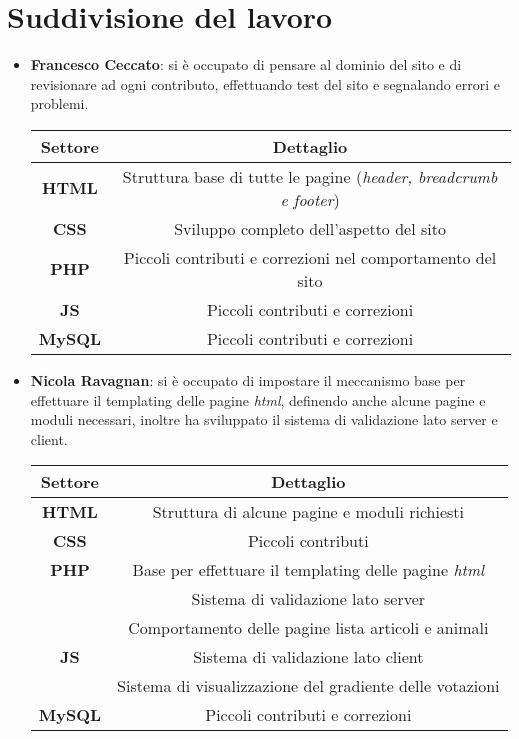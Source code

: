 \section{Suddivisione del lavoro}
\label{sec:organization}

\begin{itemize}
    \item \textbf{Francesco Ceccato}: si è occupato di pensare al dominio del sito e di revisionare ad ogni contributo, effettuando test del sito e segnalando errori e problemi.
    \begin{center}
        \begin{tabular}{| c | c |}
            \hline
            \textbf{Settore} & \textbf{Dettaglio}  \\ [0.5ex]
            \hline \hline
            \textbf{HTML} & Struttura base di tutte le pagine (\textit{header, breadcrumb e footer}) \\
            \hline
            \textbf{CSS} & Sviluppo completo dell'aspetto del sito \\
            \hline
            \textbf{PHP} & Piccoli contributi e correzioni nel comportamento del sito \\
            \hline
            \textbf{JS} & Piccoli contributi e correzioni \\
            \hline
            \textbf{MySQL} & Piccoli contributi e correzioni \\
            \hline
        \end{tabular}
    \end{center}

    \item \textbf{Nicola Ravagnan}: si è occupato di impostare il meccanismo base per effettuare il templating delle pagine \textit{html}, definendo anche alcune pagine e moduli necessari, inoltre ha sviluppato il sistema di validazione lato server e client.
    \begin{center}
        \begin{tabular}{| c | c |}
            \hline
            \textbf{Settore} & \textbf{Dettaglio}  \\ [0.5ex]
            \hline \hline
            \textbf{HTML} & Struttura di alcune pagine e moduli richiesti \\
            \hline
            \textbf{CSS} & Piccoli contributi \\
            \hline
            \textbf{PHP} & Base per effettuare il templating delle pagine \textit{html} \\
             & Sistema di validazione lato server \\
             & Comportamento delle pagine lista articoli e animali \\
             \hline
            \textbf{JS} & Sistema di validazione lato client \\
             & Sistema di visualizzazione del gradiente delle votazioni \\
            \hline
            \textbf{MySQL} & Piccoli contributi e correzioni \\
            \hline
        \end{tabular}
    \end{center}


\end{itemize}
